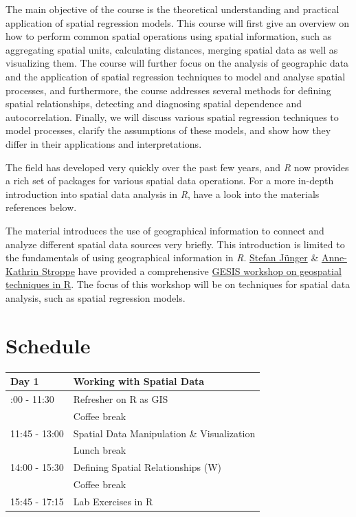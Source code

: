 \documentclass[
  letterpaper,
]{scrbook}
\begin{document}
The main objective of the course is the theoretical understanding and
practical application of spatial regression models. This course will
first give an overview on how to perform common spatial operations using
spatial information, such as aggregating spatial units, calculating
distances, merging spatial data as well as visualizing them. The course
will further focus on the analysis of geographic data and the
application of spatial regression techniques to model and analyse
spatial processes, and furthermore, the course addresses several methods
for defining spatial relationships, detecting and diagnosing spatial
dependence and autocorrelation. Finally, we will discuss various spatial
regression techniques to model processes, clarify the assumptions of
these models, and show how they differ in their applications and
interpretations.

The field has developed very quickly over the past few years, and
\emph{R} now provides a rich set of packages for various spatial data
operations. For a more in-depth introduction into spatial data analysis
in \emph{R}, have a look into the materials references below.

The material introduces the use of geographical information to connect
and analyze different spatial data sources very briefly. This
introduction is limited to the fundamentals of using geographical
information in \emph{R}. \href{https://stefanjuenger.github.io/}{Stefan
Jünger} \&
\href{https://www.gesis.org/institut/mitarbeitendenverzeichnis/person/Anne-Kathrin.Stroppe}{Anne-Kathrin
Stroppe} have provided a comprehensive
\href{https://github.com/StefanJuenger/gesis-workshop-geospatial-techniques-R-2024}{GESIS
workshop on geospatial techniques in R}. The focus of this workshop will
be on techniques for spatial data analysis, such as spatial regression
models.

\hypertarget{schedule}{%
\section*{Schedule}\label{schedule}}


\begin{longtable}[]{@{}ll@{}}
\toprule\noalign{}
Day 1 & Working with Spatial Data \\
\midrule\noalign{}
\endhead
\bottomrule\noalign{}
\endlastfoot
10:00 - 11:30 & Refresher on R as GIS \\
& Coffee break \\
11:45 - 13:00 & Spatial Data Manipulation \& Visualization \\
& Lunch break \\
14:00 - 15:30 & Defining Spatial Relationships (W) \\
& Coffee break \\
15:45 - 17:15 & Lab Exercises in R \\
\end{longtable}
\end{document}
